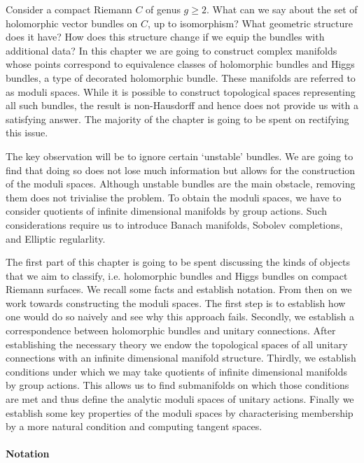 \documentclass[12pt]{ociamthesis}  %
\begin{document}
Consider a compact Riemann $C$ of genus $g\geq 2$.
What can we say about the set of holomorphic vector bundles on $C$,
up to isomorphism? What geometric structure does it have? How does
this structure change if we equip the bundles with additional data?
In this chapter we are going to construct complex manifolds whose
points correspond to equivalence classes of holomorphic bundles
and Higgs bundles, a type of decorated holomorphic bundle. These
manifolds are referred to as moduli spaces. While it
is possible to construct topological spaces representing all such bundles,
the result is non-Hausdorff and hence does not provide us with a
satisfying answer. The majority of the chapter is going to be spent
on rectifying this issue.

The key observation will be to ignore certain `unstable' bundles. We
are going to find that doing so does not lose much information but
allows for the construction of the moduli spaces. Although unstable
bundles are the main obstacle, removing them does not trivialise the
problem. To obtain the moduli spaces, we have to consider quotients
of infinite dimensional manifolds by group actions. Such considerations
require us to introduce Banach manifolds, Sobolev completions, and
Elliptic regularlity.

The first part of this chapter is going to be spent discussing the kinds of
objects that we aim to classify, i.e. holomorphic bundles and Higgs
bundles on compact Riemann surfaces. We recall some facts and establish
notation. From then on we work towards constructing the moduli spaces.
The first step is to establish how one would do so naively and
see why this approach fails. Secondly, we establish a correspondence
between holomorphic bundles and unitary connections. After establishing the necessary
theory we endow the topological spaces of all unitary connections
with an infinite dimensional manifold structure. Thirdly, we establish
conditions under which we may take quotients of infinite dimensional
manifolds by group actions. This allows us to find submanifolds on which
those conditions are met and thus define the analytic moduli spaces of
unitary actions. Finally we establish some key properties of the
moduli spaces by characterising membership by a more natural
condition and computing tangent spaces.

\paragraph*{Notation}
\end{document}
